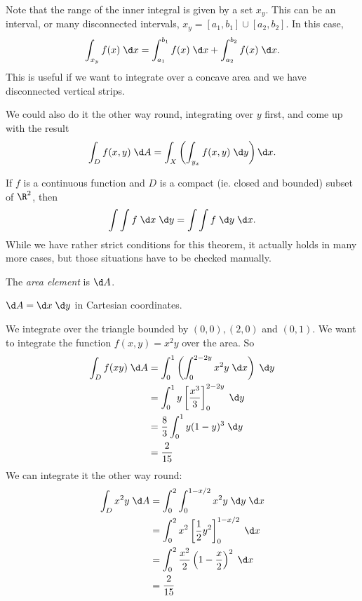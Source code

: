 \documentclass[a4paper]{article}
\begin{document}
Note that the range of the inner integral is given by a set $x_y$. This can be an interval, or many disconnected intervals, $x_y = [a_1, b_1]\cup [a_2, b_2]$. In this case,
\[
  \int_{x_y} f(x)\; \d x = \int_{a_1}^{b_1} f(x) \;\d x + \int_{a_2}^{b_2}f(x)\;\d x.
\]
This is useful if we want to integrate over a concave area and we have disconnected vertical strips.
\begin{center}
\end{center}
We could also do it the other way round, integrating over $y$ first, and come up with the result
\[
  \int_D f(x, y)\; \d A = \int_X\left(\int_{y_x}f(x, y)\; \d y\right) \d x.
\]
\begin{thm}
  If $f$ is a continuous function and $D$ is a compact (ie. closed and bounded) subset of $\R^2$, then
  \[
    \int\int f\;\d x\;\d y = \int\int f\;\d y\;\d x.
  \]
  While we have rather strict conditions for this theorem, it actually holds in many more cases, but those situations have to be checked manually.
\end{thm}
\begin{defi}
  The \emph{area element} is $\d A$.
\end{defi}

\begin{prop}
  $\d A = \d x\;\d y$ in Cartesian coordinates.
\end{prop}

\begin{eg}
  We integrate over the triangle bounded by $(0, 0), (2, 0)$ and $(0, 1)$. We want to integrate the function $f(x, y) = x^2y$ over the area. So
  \begin{align*}
    \int _D f(x y)\;\d A &= \int_0^1 \left(\int_0^{2 - 2y}x^2y \;\d x\right)\; \d y\\
    &= \int_0^1 y\left[\frac{x^3}{3}\right]^{2 - 2y}_0 \;\d y\\
    &= \frac{8}{3}\int_0^1 y(1 - y)^3\;\d y\\
    &= \frac{2}{15}
  \end{align*}
  We can integrate it the other way round:
  \begin{align*}
    \int_D x^2 y\;\d A &= \int_0^2 \int_0^{1 - x/2}x^2y \;\d y\;\d x\\
    &= \int_0^2 x^2\left[\frac{1}{2}y^2\right]_0^{1 - x/2}\;\d x\\
    &= \int_0^2 \frac{x^2}{2} \left(1 - \frac{x}{2}\right)^2 \;\d x\\
    &= \frac{2}{15}
  \end{align*}
\end{eg}
\end{document}
